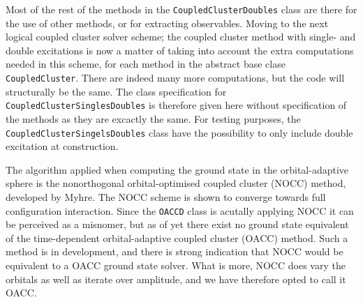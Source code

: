     Most of the rest of the methods in the \lstinline{CoupledClusterDoubles} class are there 
    for the use of other methods, or for extracting observables. Moving to the next logical 
    coupled cluster solver scheme; the coupled cluster method with single- and double 
    excitations is now a matter of taking into account the extra computations needed in 
    this scheme, for each method in the abstract base clase \lstinline{CoupledCluster}. 
    There are indeed many more computations, but the code will structurally be the same. 
    The class specification for \lstinline{CoupledClusterSinglesDoubles} is therefore 
    given here without specification of the methods as they are excactly the same. For testing 
    purposes, the \lstinline{CoupledClusterSingelsDoubles} class have the possibility 
    to only include double excitation at construction.

    

    The algorithm applied when computing the ground state in the orbital-adaptive sphere 
    is the nonorthogonal orbital-optimised coupled cluster (NOCC) method, developed by 
    Myhre\cite{myhre2018demonstrating}. The NOCC scheme is shown to converge towards full
    configuration interaction. Since the \lstinline{OACCD} class is acutally applying 
    NOCC it can be perceived as a misnomer, but as of yet there exist no ground state 
    equivalent of the time-dependent 
    orbital-adaptive coupled cluster (OACC) method. Such a method is in development, and there
    is strong indication that NOCC would be equivalent to a OACC ground state solver. What is 
    more, NOCC does vary the orbitals as well as iterate over amplitude, and we have therefore 
    opted to call it OACC.

    

